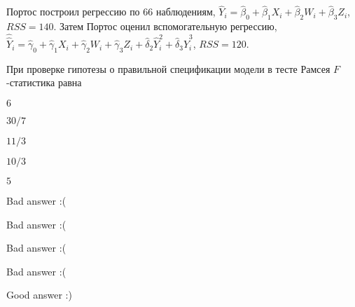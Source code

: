 
\begin{question}
Портос построил регрессию по 66 наблюдениям, \(\hat Y_i = \hat\beta_0 + \hat\beta_1 X_i + \hat\beta_2 W_i + \hat\beta_3 Z_i\), \(RSS=140\). Затем Портос оценил вспомогательную регрессию, \(\hat{\hat {Y}}_i = \hat\gamma_0 + \hat\gamma_1 X_i + \hat\gamma_2 W_i + \hat\gamma_3 Z_i + \hat\delta_2 \hat Y_i^2 + \hat\delta_3 \hat Y_i^3\), \(RSS=120\).

При проверке гипотезы о правильной спецификации модели в тесте Рамсея \(F\)-статистика равна
\begin{answerlist}
  \item \(6\)
  \item \(30/7\)
  \item \(11/3\)
  \item \(10/3\)
  \item \(5\)
\end{answerlist}
\end{question}

\begin{solution}
\begin{answerlist}
  \item Bad answer :(
  \item Bad answer :(
  \item Bad answer :(
  \item Bad answer :(
  \item Good answer :)
\end{answerlist}
\end{solution}

